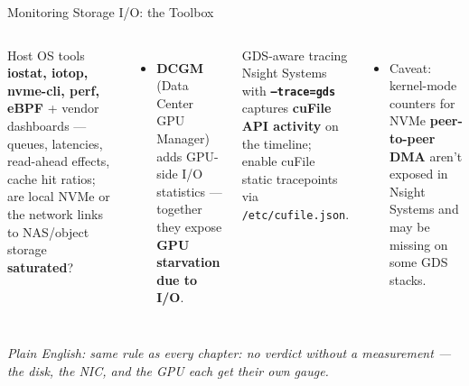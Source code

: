 \documentclass[aspectratio=169]{beamer}
\newcommand{\kw}[1]{\textbf{\textcolor{kwblue}{#1}}}
\newcommand{\pe}[1]{\par{\setlength{\fboxsep}{2.5pt}\noindent\colorbox{navy!9}{\parbox{\dimexpr\textwidth-5pt\relax}{\footnotesize\itshape Plain English: #1}}}}
\begin{document}
\begin{frame}{Monitoring Storage I/O: the Toolbox}
  \begin{columns}[t]
    \begin{block}{Host OS tools}
      \small \kw{iostat, iotop, nvme-cli, perf, eBPF} + vendor dashboards ---
      queues, latencies, read-ahead effects, cache hit ratios; are local NVMe or the
      network links to NAS/object storage \kw{saturated}?
    \end{block}
    \begin{itemize}\small
      \item \kw{DCGM} (Data Center GPU Manager) adds GPU-side I/O statistics ---
            together they expose \kw{GPU starvation due to I/O}.
    \end{itemize}
    \begin{block}{GDS-aware tracing}
      \small Nsight Systems with \kw{\texttt{--trace=gds}} captures \kw{cuFile API activity}
      on the timeline; enable cuFile static tracepoints via \texttt{/etc/cufile.json}.
    \end{block}
    \begin{itemize}\small
      \item Caveat: kernel-mode counters for NVMe \kw{peer-to-peer DMA} aren't exposed in
            Nsight Systems and may be missing on some GDS stacks.
    \end{itemize}
  \end{columns}
  \pe{same rule as every chapter: no verdict without a measurement --- the disk, the NIC, and the GPU each get their own gauge.}
\end{frame}
\end{document}
